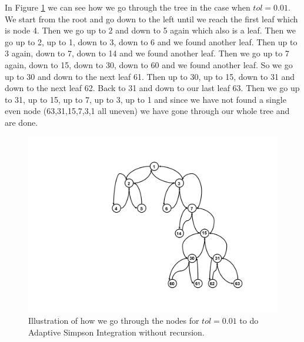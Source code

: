 \documentclass[a4paper,10pt]{article}
\begin{document}
In Figure \ref{fig: tree} we can see how we go through the tree in the case when $tol=0.01$. We start from the root and go down to the left until we reach the first leaf which is node 4. Then we go up to 2 and down to 5 again which also is a leaf. Then we go up to 2, up to 1, down to 3, down to 6 and we found another leaf. Then up to 3 again, down to 7, down to 14 and we found another leaf. Then we go up to 7 again, down to 15, down to 30, down to 60 and we found another leaf. So we go up to 30 and down to the next leaf 61. Then up to 30, up to 15, down to 31 and down to the next leaf 62. Back to 31 and down to our last leaf 63. Then we go up to 31, up to 15, up to 7, up to 3, up to 1 and since we have not found a single even node (63,31,15,7,3,1 all uneven) we have gone through our whole tree and are done.

\begin{figure}[h!]
	\centering
	\includegraphics[width=\textwidth]{tree_graph}
	\begin{minipage}[t]{105mm}
	  \caption{
	    Illustration of how we go through the nodes for 
	    $tol=0.01$ to do Adaptive Simpson Integration without recursion.
	  }
	\end{minipage}
	\label{fig: tree}
\end{figure}
\end{document}
